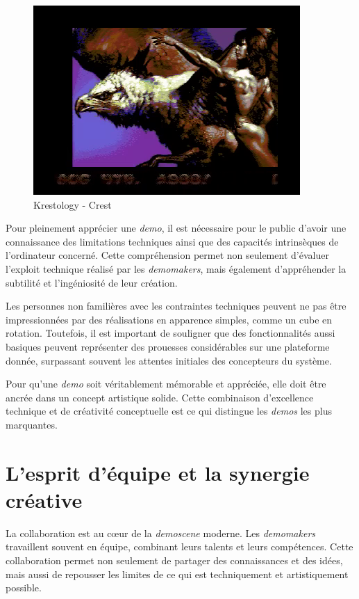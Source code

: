 \begin{figure}[h]
\begin{minipage}[b]{0.30\linewidth}
    \includegraphics[width=\linewidth]{images/demoscene/demos/kresto3.png}
  \end{minipage}
  \caption{Krestology - Crest}
  \label{crest}
\end{figure}

Pour pleinement apprécier une \textit{demo}, il est nécessaire pour le public d'avoir une connaissance des limitations techniques ainsi que des capacités intrinsèques de l'ordinateur concerné. Cette compréhension permet non seulement d'évaluer l'exploit technique réalisé par les \textit{demomakers}, mais également d'appréhender la subtilité et l'ingéniosité de leur création.

Les personnes non familières avec les contraintes techniques peuvent ne pas être impressionnées par des réalisations en apparence simples, comme un cube en rotation. Toutefois, il est important de souligner que des fonctionnalités aussi basiques peuvent représenter des prouesses considérables sur une plateforme donnée, surpassant souvent les attentes initiales des concepteurs du système.

Pour qu'une \textit{demo} soit véritablement mémorable et appréciée, elle doit être ancrée dans un concept artistique solide. Cette combinaison d'excellence technique et de créativité conceptuelle est ce qui distingue les \textit{demos} les plus marquantes.

\section{L'esprit d'équipe et la synergie créative}
La collaboration est au cœur de la \textit{demoscene} moderne. Les \textit{demomakers} travaillent souvent en équipe, combinant leurs talents et leurs compétences. Cette collaboration permet non seulement de partager des connaissances et des idées, mais aussi de repousser les limites de ce qui est techniquement et artistiquement possible.

